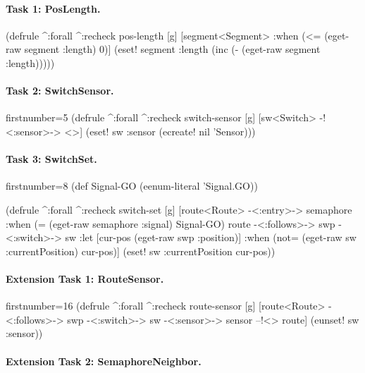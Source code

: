 \documentclass[submission]{eptcs}
\begin{document}
\paragraph{Task 1: PosLength.}

\begin{clojurecode}
(defrule ^:forall ^:recheck pos-length [g]
  [segment<Segment>
   :when (<= (eget-raw segment :length) 0)]
  (eset! segment :length (inc (- (eget-raw segment :length)))))
\end{clojurecode}


\paragraph{Task 2: SwitchSensor.}

\begin{clojurecode*}{firstnumber=5}
(defrule ^:forall ^:recheck switch-sensor [g]
  [sw<Switch> -!<:sensor>-> <>]
  (eset! sw :sensor (ecreate! nil 'Sensor)))
\end{clojurecode*}


\paragraph{Task 3: SwitchSet.}

\begin{clojurecode*}{firstnumber=8}
(def Signal-GO (eenum-literal 'Signal.GO))

(defrule ^:forall ^:recheck switch-set [g]
  [route<Route> -<:entry>-> semaphore
   :when (= (eget-raw semaphore :signal) Signal-GO)
   route -<:follows>-> swp -<:switch>-> sw
   :let [cur-pos (eget-raw swp :position)]
   :when (not= (eget-raw sw :currentPosition) cur-pos)]
  (eset! sw :currentPosition cur-pos))
\end{clojurecode*}


\paragraph{Extension Task 1: RouteSensor.}

\begin{clojurecode*}{firstnumber=16}
(defrule ^:forall ^:recheck route-sensor [g]
  [route<Route> -<:follows>-> swp -<:switch>-> sw
   -<:sensor>-> sensor --!<> route]
  (eunset! sw :sensor))
\end{clojurecode*}


\paragraph{Extension Task 2: SemaphoreNeighbor.}
\end{document}
